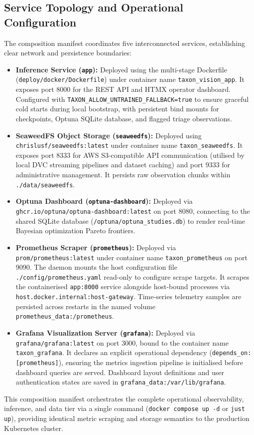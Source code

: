 \subsection{Service Topology and Operational Configuration}

The composition manifest coordinates five interconnected services, establishing clear network and persistence boundaries:

\begin{itemize}
    \item \textbf{Inference Service (\texttt{app}):} Deployed using the multi-stage Dockerfile (\texttt{deploy/docker/Dockerfile}) under container name \texttt{taxon\_vision\_app}. It exposes port 8000 for the REST API and HTMX operator dashboard. Configured with \texttt{TAXON\_ALLOW\_UNTRAINED\_FALLBACK=true} to ensure graceful cold starts during local bootstrap, with persistent bind mounts for checkpoints, Optuna SQLite database, and flagged triage observations.
    \item \textbf{SeaweedFS Object Storage (\texttt{seaweedfs}):} Deployed using \texttt{chrislusf/seaweedfs:latest} under container name \texttt{taxon\_seaweedfs}. It exposes port 8333 for AWS S3-compatible API communication (utilised by local DVC streaming pipelines and dataset caching) and port 9333 for administrative management. It persists raw observation chunks within \texttt{./data/seaweedfs}.
    \item \textbf{Optuna Dashboard (\texttt{optuna-dashboard}):} Deployed via \texttt{ghcr.io/optuna/optuna-dashboard:latest} on port 8080, connecting to the shared SQLite database (\texttt{/optuna/optuna\_studies.db}) to render real-time Bayesian optimization Pareto frontiers.
    \item \textbf{Prometheus Scraper (\texttt{prometheus}):} Deployed via \texttt{prom/prometheus:latest} under container name \texttt{taxon\_prometheus} on port 9090. The daemon mounts the host configuration file \texttt{./config/prometheus.yaml} read-only to configure scrape targets. It scrapes the containerised \texttt{app:8000} service alongside host-bound processes via \texttt{host.docker.internal:host-gateway}. Time-series telemetry samples are persisted across restarts in the named volume \texttt{prometheus\_data:/prometheus}.
    \item \textbf{Grafana Visualization Server (\texttt{grafana}):} Deployed via \texttt{grafana/grafana:latest} on port 3000, bound to the container name \texttt{taxon\_grafana}. It declares an explicit operational dependency (\texttt{depends\_on: [prometheus]}), ensuring the metrics ingestion pipeline is initialised before dashboard queries are served. Dashboard layout definitions and user authentication states are saved in \texttt{grafana\_data:/var/lib/grafana}.
\end{itemize}

This composition manifest orchestrates the complete operational observability, inference, and data tier via a single command (\texttt{docker compose up -d} or \texttt{just up}), providing identical metric scraping and storage semantics to the production Kubernetes cluster.
